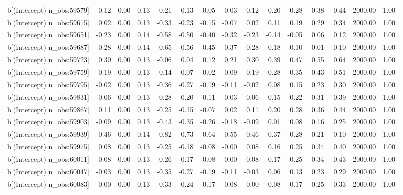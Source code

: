 \begin{table}[ht]
\begin{tabular}{rrrrrrrrrrrrrrr}
  b[(Intercept) n\_obs:59579] & 0.12 & 0.00 & 0.13 & -0.21 & -0.13 & -0.05 & 0.03 & 0.12 & 0.20 & 0.28 & 0.38 & 0.44 & 2000.00 & 1.00 \\ 
  b[(Intercept) n\_obs:59615] & 0.02 & 0.00 & 0.13 & -0.33 & -0.23 & -0.15 & -0.07 & 0.02 & 0.11 & 0.19 & 0.29 & 0.34 & 2000.00 & 1.00 \\ 
  b[(Intercept) n\_obs:59651] & -0.23 & 0.00 & 0.14 & -0.58 & -0.50 & -0.40 & -0.32 & -0.23 & -0.14 & -0.05 & 0.06 & 0.12 & 2000.00 & 1.00 \\ 
  b[(Intercept) n\_obs:59687] & -0.28 & 0.00 & 0.14 & -0.65 & -0.56 & -0.45 & -0.37 & -0.28 & -0.18 & -0.10 & 0.01 & 0.10 & 2000.00 & 1.00 \\ 
  b[(Intercept) n\_obs:59723] & 0.30 & 0.00 & 0.13 & -0.06 & 0.04 & 0.12 & 0.21 & 0.30 & 0.39 & 0.47 & 0.55 & 0.64 & 2000.00 & 1.00 \\ 
  b[(Intercept) n\_obs:59759] & 0.19 & 0.00 & 0.13 & -0.14 & -0.07 & 0.02 & 0.09 & 0.19 & 0.28 & 0.35 & 0.43 & 0.51 & 2000.00 & 1.00 \\ 
  b[(Intercept) n\_obs:59795] & -0.02 & 0.00 & 0.13 & -0.36 & -0.27 & -0.19 & -0.11 & -0.02 & 0.08 & 0.15 & 0.23 & 0.30 & 2000.00 & 1.00 \\ 
  b[(Intercept) n\_obs:59831] & 0.06 & 0.00 & 0.13 & -0.28 & -0.20 & -0.11 & -0.03 & 0.06 & 0.15 & 0.22 & 0.31 & 0.39 & 2000.00 & 1.00 \\ 
  b[(Intercept) n\_obs:59867] & 0.11 & 0.00 & 0.13 & -0.25 & -0.15 & -0.07 & 0.02 & 0.11 & 0.20 & 0.28 & 0.36 & 0.44 & 2000.00 & 1.00 \\ 
  b[(Intercept) n\_obs:59903] & -0.09 & 0.00 & 0.13 & -0.43 & -0.35 & -0.26 & -0.18 & -0.09 & 0.01 & 0.08 & 0.16 & 0.25 & 2000.00 & 1.00 \\ 
  b[(Intercept) n\_obs:59939] & -0.46 & 0.00 & 0.14 & -0.82 & -0.73 & -0.64 & -0.55 & -0.46 & -0.37 & -0.28 & -0.21 & -0.10 & 2000.00 & 1.00 \\ 
  b[(Intercept) n\_obs:59975] & 0.08 & 0.00 & 0.13 & -0.25 & -0.18 & -0.08 & -0.00 & 0.08 & 0.16 & 0.25 & 0.34 & 0.40 & 2000.00 & 1.00 \\ 
  b[(Intercept) n\_obs:60011] & 0.08 & 0.00 & 0.13 & -0.26 & -0.17 & -0.08 & -0.00 & 0.08 & 0.17 & 0.25 & 0.34 & 0.43 & 2000.00 & 1.00 \\ 
  b[(Intercept) n\_obs:60047] & -0.03 & 0.00 & 0.13 & -0.35 & -0.27 & -0.19 & -0.11 & -0.03 & 0.06 & 0.13 & 0.23 & 0.29 & 2000.00 & 1.00 \\ 
  b[(Intercept) n\_obs:60083] & 0.00 & 0.00 & 0.13 & -0.33 & -0.24 & -0.17 & -0.08 & -0.00 & 0.08 & 0.17 & 0.25 & 0.33 & 2000.00 & 1.00 \\ 

\end{tabular}
\end{table}
